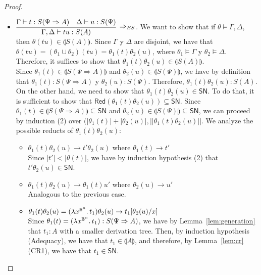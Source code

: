 \documentclass[preprint]{elsarticle}
\newcommand\interp[1]{\llparenthesis #1\rrparenthesis}
\newcommand\size[1]{||#1||}
\newcommand\Red[1]{\mathsf{Red}(#1)}
\newcommand\SN{\mathsf{SN}}
\newcommand\lpl[1]{|#1|}
\newcommand\B{\ensuremath{\mathbb B}}
\newcommand{\app}[2]{#1 #2}
\newcommand{\reducesto}{\rightarrow}
\newcommand{\vrbl}[2]{#1^{#2}}
\newcommand{\abstr}[2]{\lambda#1\ldotp#2}
\begin{document}
\begin{proof}
\begin{itemize}
  \item \( \vcenter{\infer[\Rightarrow_{ES}]{\Gamma, \Delta \vdash t u :
        S(A)}{\Gamma \vdash t : S(\Psi \Rightarrow A) & \Delta \vdash u :
        S(\Psi)}} \). We want to show that if \( \theta \models \Gamma, \Delta \), then \( \theta(\app{t}{u}) \in \interp{S(A)} \).
    Since \( \Gamma \) y \( \Delta \) are disjoint, we have that \( \theta(\app{t}{u}) = (\theta_1 \cup \theta_2)(\app{t}{u}) = \app{\theta_1(t)}{\theta_2(u)} \), where \( \theta_1 \models \Gamma \) y \( \theta_2 \models \Delta \).
    Therefore, it suffices to show that \( \app{\theta_1(t)}{\theta_2(u)} \in \interp{S(A)} \).
    \\ Since \( \theta_1(t) \in \interp{S(\Psi \Rightarrow A)} \) and \( \theta_2(u) \in \interp{S(\Psi)} \), we have by definition that \( \theta_1(t) : S(\Psi \Rightarrow A) \) y \( \theta_2(u) : S(\Psi) \). Therefore, \( \app{\theta_1(t)}{\theta_2(u)} : S(A) \).
    \\ On the other hand, we need to show that \( \app{\theta_1(t)}{\theta_2(u)} \in \SN \). To do that, it is sufficient to show that \( \Red{\app{\theta_1(t)}{\theta_2(u)}} \subseteq \SN \). Since \( \theta_1(t) \in \interp{S(\Psi \Rightarrow A)} \subseteq \SN \) and \( \theta_2(u) \in \interp{S(\Psi)} \subseteq \SN \), we can proceed by induction (2) over \( (\lpl{\theta_1(t)} + \lpl{\theta_2(u)}, \size{\app{\theta_1(t)}{\theta_2(u)}} \). We analyze the possible reducts of \( \app{\theta_1(t)}{\theta_2(u)} \):
    \begin{itemize}
    \item \( \app{\theta_1(t)}{\theta_2(u)} \reducesto \app{t'}{\theta_2(u)} \) where \( \theta_1(t) \reducesto t' \)
      \\ Since \( \lpl{t'} < \lpl{\theta(t)} \), we have by induction hypothesis (2) that \( \app{t'}{\theta_2(u)} \in \SN \).
    \item \( \app{\theta_1(t)}{\theta_2(u)} \reducesto \app{\theta_1(t)}{u'} \) where \( \theta_2(u) \reducesto u' \)
      \\ Analogous to the previous case.
    \item \( \app{\theta_1(t)}{\theta_2(u)} = \app{(\abstr{\vrbl{x}{\B^n}}{t_1})}{\theta_2(u)} \reducesto t_1[\theta_2(u)/x] \)
      \\ Since \( \theta_1(t) = (\abstr{\vrbl{x}{\B^n}}{t_1}) : S(\Psi \Rightarrow A) \), we have by Lemma~\ref{lem:generation}  that \( t_1 : A \) with a smaller derivation tree. Then, by induction hypothesis (Adequacy), we have that \( t_1 \in \interp{A} \), and therefore, by Lemma~\ref{lem:cr} (CR1), we have that \( t_1 \in \SN \).

\end{itemize}
\end{itemize}
\end{proof}
\end{document}
